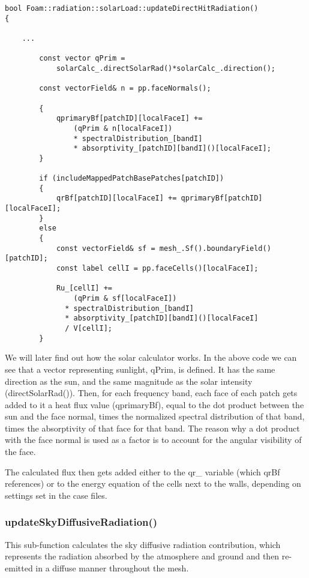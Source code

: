 \begin{verbatim}
bool Foam::radiation::solarLoad::updateDirectHitRadiation()
{
    
    ...

        const vector qPrim =
            solarCalc_.directSolarRad()*solarCalc_.direction();

        const vectorField& n = pp.faceNormals();

        {
            qprimaryBf[patchID][localFaceI] +=
                (qPrim & n[localFaceI])
                * spectralDistribution_[bandI]
                * absorptivity_[patchID][bandI]()[localFaceI];
        }

        if (includeMappedPatchBasePatches[patchID])
        {
            qrBf[patchID][localFaceI] += qprimaryBf[patchID][localFaceI];
        }
        else
        {
            const vectorField& sf = mesh_.Sf().boundaryField()[patchID];
            const label cellI = pp.faceCells()[localFaceI];

            Ru_[cellI] +=
                (qPrim & sf[localFaceI])
              * spectralDistribution_[bandI]
              * absorptivity_[patchID][bandI]()[localFaceI]
              / V[cellI];
        }
\end{verbatim}

We will later find out how the solar calculator works. In the above code we can see that a vector representing sunlight, qPrim, is defined. It has the same direction as the sun, and the same magnitude as the solar intensity (directSolarRad()). Then, for each frequency band, each face of each patch gets added to it a heat flux value (qprimaryBf), equal to the dot product between the sun and the face normal, times the normalized spectral distribution of that band, times the absorptivity of that face for that band. The reason why a dot product with the face normal is used as a factor is to account for the angular visibility of the face.

The calculated flux then gets added either to the qr\_ variable (which qrBf references) or to the energy equation of the cells next to the walls, depending on settings set in the case files.

\subsubsection{updateSkyDiffusiveRadiation()}

This sub-function calculates the sky diffusive radiation contribution, which represents the radiation absorbed by the atmosphere and ground and then re-emitted in a diffuse manner throughout the mesh.

